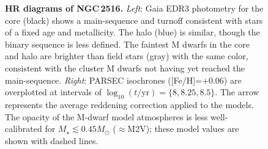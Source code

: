\documentclass[12pt,twocolumn,tighten]{aastex63}
\begin{document}
\begin{figure}[t]
	\begin{center}
		\leavevmode
	\end{center}
	\vspace{-0.7cm}
  \caption{ {\bf HR diagrams of NGC\,2516.}
    {\it Left}: Gaia EDR3 photometry for the core (black) shows a
    main-sequence and turnoff consistent with stars of a fixed age and
    metallicity.  The halo (blue) is similar, though the binary
    sequence is less defined.  The faintest M dwarfs in the core and
    halo are brighter than field stars (gray) with the same color,
    consistent with the cluster M dwarfs not having yet reached the
    main-sequence.  {\it Right}: PARSEC isochrones ([Fe/H]=+0.06) are
    overplotted at intervals of $\log_{10}(t/\mathrm{yr})=\{8, 8.25,
    8.5\}$.  The arrow represents the average reddening correction
    applied to the models.  The opacity of the M-dwarf model
    atmospheres is less well-calibrated for $M_\star \lesssim
    0.45M_\odot$ ($\approx$M2V); these model values are shown with
    dashed lines.
    \label{fig:hr}
  }
\end{figure}
\end{document}

